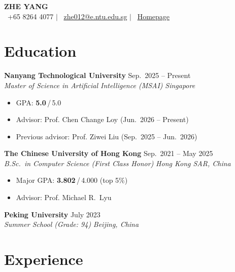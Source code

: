 \documentclass[a4paper,11pt]{article}
\begin{document}
\begin{center}
  {\LARGE\bfseries ZHE YANG} \\[4pt]
  \faPhone\ +65 8264 4077 \quad $|$ \quad
  \faEnvelope\ \href{mailto:zhe012@e.ntu.edu.sg}{zhe012@e.ntu.edu.sg} \quad $|$ \quad
  \faHome\ \href{https://savannah-yz.github.io/}{Homepage}
\end{center}

\section{Education}

\textbf{Nanyang Technological University} \hfill Sep.\ 2025 -- Present \\
\textit{Master of Science in Artificial Intelligence (MSAI)} \hfill \textit{Singapore}
\begin{itemize}
  \item GPA: \textbf{5.0}\,/\,5.0
  \item Advisor: Prof. Chen Change Loy (Jun.\ 2026 -- Present)
  \item Previous advisor: Prof. Ziwei Liu (Sep.\ 2025 -- Jun.\ 2026)
\end{itemize}

\vspace{4pt}

\textbf{The Chinese University of Hong Kong} \hfill Sep.\ 2021 -- May 2025 \\
\textit{B.Sc.\ in Computer Science (First Class Honor)} \hfill \textit{Hong Kong SAR, China}
\begin{itemize}
  \item Major GPA: \textbf{3.802}\,/\,4.000 (top 5\%)
  \item Advisor: Prof. Michael R.\ Lyu
\end{itemize}

\vspace{4pt}

\textbf{Peking University} \hfill July 2023 \\
\textit{Summer School (Grade: 94)} \hfill \textit{Beijing, China}

\section{Experience}
\end{document}
